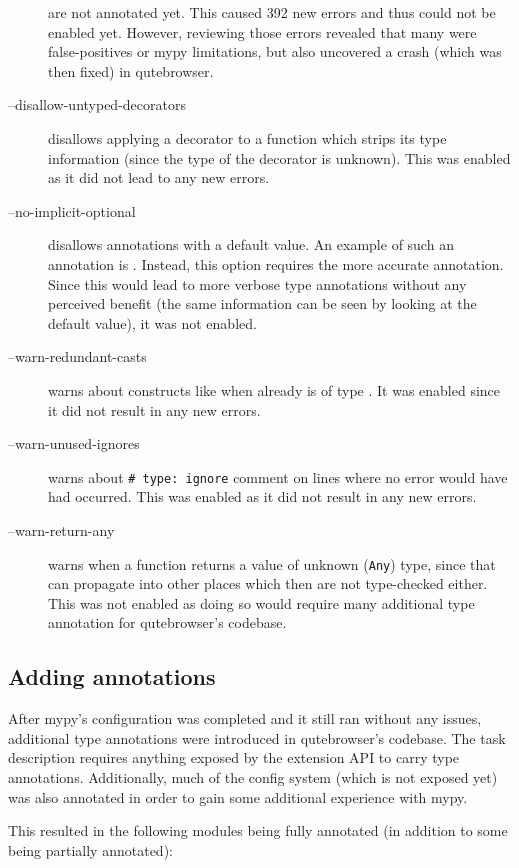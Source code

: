 \begin{description}
    are not annotated yet. This caused 392 new errors and thus could not be
    enabled yet. However, reviewing those errors revealed that many were
    false-positives or mypy limitations, but also uncovered a crash (which was
    then fixed) in qutebrowser.
  \item[--disallow-untyped-decorators] disallows applying a decorator to a
    function which strips its type information (since the type of the decorator
    is unknown). This was enabled as it did not lead to any new errors.
  \item[--no-implicit-optional] disallows annotations with a  default
    value. An example of such an annotation is .
    Instead, this option requires the more accurate 
    annotation. Since this would lead to more verbose type annotations without any
    perceived benefit (the same information can be seen by looking at the default
    value), it was not enabled.
  \item[--warn-redundant-casts] warns about constructs like  when  already is of type . It was enabled since it
    did not result in any new errors.
  \item[--warn-unused-ignores] warns about \texttt{# type: ignore}
    comment on lines where no error would have had occurred. This was enabled as
    it did not result in any new errors.
  \item[--warn-return-any] warns when a function returns a value of unknown
    (\verb|Any|) type, since that can propagate into other places which then are
    not type-checked either. This was not enabled as doing so would require many
    additional type annotation for qutebrowser's codebase.
\end{description}

\subsection{Adding annotations}

After mypy's configuration was completed and it still ran without any issues,
additional type annotations were introduced in qutebrowser's codebase. The task
description requires anything exposed by the extension API to carry type
annotations. Additionally, much of the config system (which is not exposed yet)
was also annotated in order to gain some additional experience with mypy.

This resulted in the following modules being fully annotated (in addition to
some being partially annotated):


